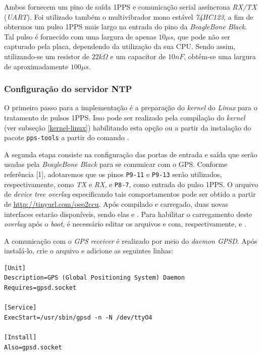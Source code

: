 Ambos fornecem um pino de saída 1PPS e comunicação serial assíncrona
\textit{RX/TX} (\textit{UART}). Foi utilizado também o multivibrador mono
estável \textit{74HC123}, a fim de obtermos um pulso 1PPS mais largo na entrada
do pino da \textit{BeagleBone Black}. Tal pulso é fornecido com uma largura de
apenas \(10\mu s\), que pode não ser capturado pela placa, dependendo da
utilização da sua CPU. Sendo assim, utilizando-se um resistor de \(22k\Omega\) e um
capacitor de \(10nF\), obtém-se uma largura de aproximadamente \(100 \mu s\).

\subsubsection{Configuração do servidor NTP}

O primeiro passo para a implementação é a preparação do \textit{kernel} do
\textit{Linux} para o tratamento de pulsos 1PPS. Isso pode ser realizado pela
compilação do \textit{kernel} (ver subseção \ref{kernel-linux}) habilitando esta
opção ou a partir da instalação do pacote \texttt{pps-tools} a partir do comando
 .

\vspace{12pt}

A segunda etapa consiste na configuração das portas de entrada e
saída que serão usadas pela \textit{BeagleBone Black} para se comunicar com o
GPS. Conforme referência [1], adotaremos que os pinos \texttt{P9-11} e
\texttt{P9-13} serão utilizados, respectivamente, como \textit{TX} e
\textit{RX}, e \texttt{P8-7}, como entrada do pulso 1PPS. O arquivo de
\textit{device tree overlay} especificando tais comportamentos pode ser obtido
a partir de \url{http://tinyurl.com/oeo2ccu}. Após compilado e carregado, duas
novas  interfaces estarão disponíveis, sendo elas  e
. Para habilitar o carregamento deste \textit{overlay} após o
\textit{boot}, é necessário editar os arquivos  e
 com, respectivamente,
 e .

\vspace{12pt}
 
A comunicação com o \textit{GPS receiver} é realizado por meio do
\textit{daemon GPSD}. Após instalá-lo, crie o arquivo
 e adicione as seguintes linhas:

\begin{lstlisting}[keywordstyle=\ttfamily, style=nonumbers]
[Unit]
Description=GPS (Global Positioning System) Daemon
Requires=gpsd.socket

[Service]
ExecStart=/usr/sbin/gpsd -n -N /dev/ttyO4

[Install]
Also=gpsd.socket
\end{lstlisting}

